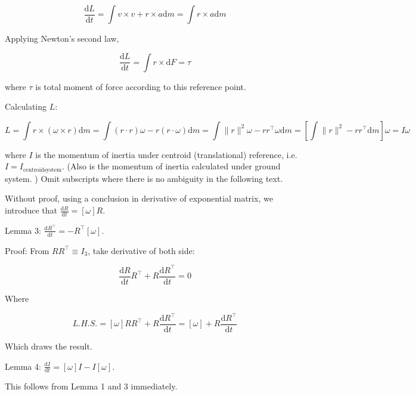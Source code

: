 \documentclass[utf8]{article}
\begin{document}
\begin{equation}\label{}
  \frac{\mathrm{d} L}{\mathrm{d} t} = \int v \times v + r\times a \mathrm{d}m = \int r\times a \mathrm{d}m
\end{equation}

Applying Newton's second law,

\begin{equation}\label{}
  \frac{\mathrm{d} L}{\mathrm{d} t} = \int r\times \mathrm{d}F = \tau
\end{equation}

where $\tau$ is total moment of force according to this reference point.

Calculating $L$:

\begin{equation}\label{}
  L = \int r \times (\omega \times r) \mathrm{d}m = \int (r \cdot r)\omega - r(r \cdot \omega) \mathrm{d}m = \int \|r\|^2\omega - rr^\top \omega \mathrm{d}m = \left[\int \|r\|^2 - rr^\top \mathrm{d}m \right] \omega = I\omega
\end{equation}

where $I$ is the momentum of inertia under centroid (translational) reference, i.e. $I = I_{\mathrm{centroid system}}$. (Also is the momentum of inertia calculated under ground system. ) Omit subscripts where there is no ambiguity in the following text.

Without proof, using a conclusion in derivative of exponential matrix, we introduce that $\frac{\mathrm{d} R}{\mathrm{d}t} = [\omega] R$.

Lemma 3: $\frac{\mathrm{d} R^\top}{\mathrm{d}t} = -R^\top [\omega]$.

Proof: From $R R^\top \equiv I_3$, take derivative of both side:

\begin{equation}\label{}
  \frac{\mathrm{d} R}{\mathrm{d}t} R^\top + R \frac{\mathrm{d} R^\top}{\mathrm{d}t} = 0
\end{equation}

Where

\begin{equation}\label{}
  L.H.S. = [\omega] R R^\top + R \frac{\mathrm{d} R^\top}{\mathrm{d}t} = [\omega] + R \frac{\mathrm{d} R^\top}{\mathrm{d}t}
\end{equation}

Which draws the result.

Lemma 4: $\frac{\mathrm{d} I}{\mathrm{d}t} = [\omega]I - I[\omega]$.

This follows from Lemma 1 and 3 immediately.
\end{document}
